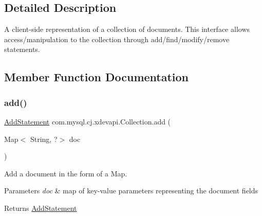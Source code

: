 \subsection{Detailed Description}
A client-\/side representation of a collection of documents. This interface allows access/manipulation to the collection through add/find/modify/remove statements. 

\subsection{Member Function Documentation}
\mbox{\label{interfacecom_1_1mysql_1_1cj_1_1xdevapi_1_1_collection_a93ea1bd694426124c92aa5ae3bf29d2b}} 
\subsubsection{\texorpdfstring{add()}{add()}\hspace{0.1cm}{\footnotesize\ttfamily [1/4]}}
{\footnotesize\ttfamily \mbox{\hyperlink{interfacecom_1_1mysql_1_1cj_1_1xdevapi_1_1_add_statement}{Add\+Statement}} com.\+mysql.\+cj.\+xdevapi.\+Collection.\+add (\begin{DoxyParamCaption}\item[{Map$<$ String, ?$>$}]{doc }\end{DoxyParamCaption})}

Add a document in the form of a Map.


\begin{DoxyParams}{Parameters}
{\em doc} & map of key-\/value parameters representing the document fields \\
\hline
\end{DoxyParams}
\begin{DoxyReturn}{Returns}
\mbox{\hyperlink{interfacecom_1_1mysql_1_1cj_1_1xdevapi_1_1_add_statement}{Add\+Statement}} 
\end{DoxyReturn}
\mbox{\label{interfacecom_1_1mysql_1_1cj_1_1xdevapi_1_1_collection_aab1599c23da452aa0ad03eb89ede38a0}} 
